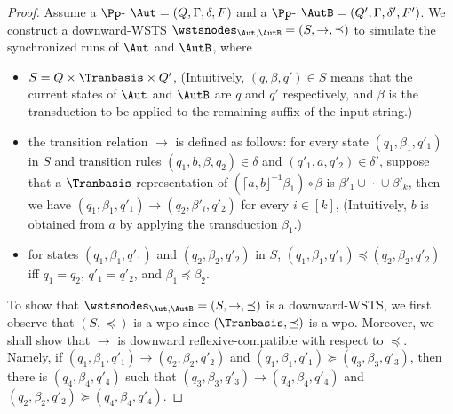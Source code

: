 \begin{proof}
Assume a $\Pp$-{\WOTrNFA} $\Aut = (Q, \Gamma, \delta, F)$ and a $\Pp$-{\NFA} $\AutB = (Q', \Gamma, \delta', F')$.
We construct a downward-WSTS $\wstsnodes_{\Aut,\AutB} = (S, \rightarrow, \preceq)$ 
%
to simulate the synchronized runs of $\Aut$ and $\AutB$, where
\begin{itemize}
	\item $S = Q \times \Tranbasis \times Q'$, (Intuitively, $(q, \beta, q') \in S$ means that the current states of $\Aut$ and $\AutB$ are $q$ and $q'$ respectively, and $\beta$ is the transduction to be applied to the remaining suffix of the input string.)
	\item the transition relation $\xrightarrow{}$ is defined as follows:  for every state $(q_1, \beta_1, q'_1)$ in $S$ and transition rules $(q_1, b, \beta, q_2) \in \delta$ and $(q'_1, a, q'_2) \in \delta'$, suppose that a $\Tranbasis$-representation of $( \lceil a, b \rfloor^{-1} \beta_1) \circ \beta$ is $\beta'_1 \cup \cdots \cup \beta'_k$,  then we have $(q_1, \beta_1, q'_1) \xrightarrow{} (q_2, \beta'_i, q'_2)$ for every $i \in [k]$, (Intuitively, $b$ is obtained from $a$ by applying the transduction $\beta_1$.)
%	
	\item for states $(q_1, \beta_1, q'_1)$ and $(q_2, \beta_2, q'_2)$ in $S$, $(q_1, \beta_1, q'_1) \preceq (q_2, \beta_2, q'_2)$ iff $q_1= q_2$, $q'_1 = q'_2$, and $\beta_1 \preceq \beta_2$.
\end{itemize}

To show that $\wstsnodes_{\Aut,\AutB} = (S, \rightarrow, \preceq)$ is a downward-WSTS, we first observe that $(S, \preceq)$ is a wpo since $(\Tranbasis, \preceq)$ is a wpo. Moreover, we shall show that $\rightarrow$ is downward reflexive-compatible with respect to $\preceq$. Namely, if $(q_1, \beta_1, q'_1) \rightarrow (q_2, \beta_2, q'_2)$ and $(q_1, \beta_1, q'_1) \succeq (q_3, \beta_3, q'_3)$, then there is $(q_4, \beta_4, q'_4)$ such that $(q_3, \beta_3, q'_3) \rightarrow (q_4, \beta_4, q'_4)$ and $(q_2, \beta_2, q'_2) \succeq (q_4, \beta_4, q'_4)$. 


\end{proof}
